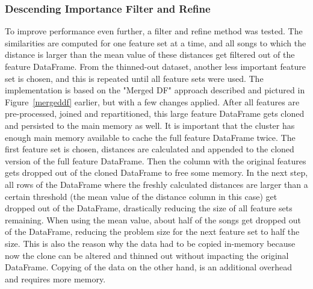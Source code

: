 \subsubsection{Descending Importance Filter and Refine}\label{farfs}

To improve performance even further, a filter and refine method was tested. The similarities are computed for one feature set at a time, and all songs to which the distance is larger than the mean value of these distances get filtered out of the feature DataFrame. From the thinned-out dataset, another less important feature set is chosen, and this is repeated until all feature sets were used. 
The implementation is based on the "Merged DF" approach described and pictured in Figure~\ref{mergeddf} earlier, but with a few changes applied. After all features are pre-processed, joined and repartitioned, this large feature DataFrame gets cloned and persisted to the main memory as well. It is important that the cluster has enough main memory available to cache the full feature DataFrame twice. 
\noindent The first feature set is chosen, distances are calculated and appended to the cloned version of the full feature DataFrame. Then the column with the original features gets dropped out of the cloned DataFrame to free some memory. In the next step, all rows of the DataFrame where the freshly calculated distances are larger than a certain threshold (the mean value of the distance column in this case) get dropped out of the DataFrame, drastically reducing the size of all feature sets remaining.
When using the mean value, about half of the songs get dropped out of the DataFrame, reducing the problem size for the next feature set to half the size. This is also the reason why the data had to be copied in-memory because now the clone can be altered and thinned out without impacting the original DataFrame. Copying of the data on the other hand, is an additional overhead and requires more memory. 

